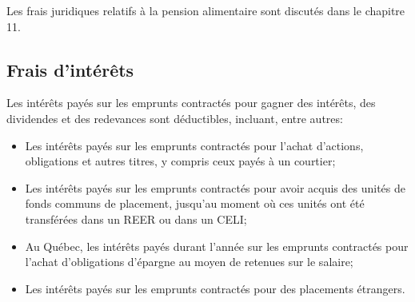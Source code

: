 Les frais juridiques relatifs à la pension alimentaire sont discutés dans le chapitre 11.

\subsection{Frais d'intérêts}
\label{fraisDePlacementFraisDInterets}
Les intérêts payés sur les emprunts contractés pour gagner des intérêts, des dividendes et des redevances sont déductibles, incluant, entre autres:
\begin{itemize}
	\item Les intérêts payés sur les emprunts contractés pour l'achat d'actions, obligations et autres titres, y compris ceux payés à un courtier;
	\item Les intérêts payés sur les emprunts contractés pour avoir acquis des unités de fonds communs de placement, jusqu'au moment où ces unités ont été transférées dans un REER ou dans un CELI; 
	\item Au Québec, les intérêts payés durant l'année sur les emprunts contractés pour l'achat d'obligations d'épargne au moyen de retenues sur le salaire;
	\item Les intérêts payés sur les emprunts contractés pour des placements étrangers.
\end{itemize}


